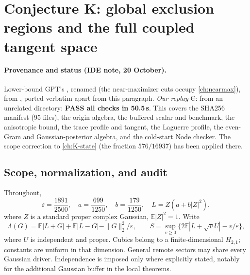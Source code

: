 \section{Conjecture K: global exclusion regions and the full coupled tangent space}
\label{ch:global-local-coupled-K}

\paragraph{Provenance and status (IDE note, 20 October).} Lower-bound GPT's , renamed  (the near-maximizer cuts occupy \autoref{ch:nearmax}), from , ported verbatim apart from this paragraph. \emph{Our replay} \st{C}:
 from an unrelated directory: \textbf{PASS all checks in 50.5\,s}. This covers the SHA256 manifest (95 files), the origin algebra, the
buffered scalar and benchmark, the anisotropic bound, the trace profile and tangent, the Laguerre profile, the even-Gram and Gaussian-posterior algebra, and the cold-start Node checker.
The scope correction to \autoref{ch:K-state} (the fraction $576/16937$) has been applied there.


\subsection{Scope, normalization, and audit}
Throughout,
\[
 \varepsilon=\frac{1891}{2500},\quad a=\frac{699}{1250},\quad
 b=\frac{179}{1250},\quad L=Z(a+b|Z|^2),
\]
where $Z$ is a standard proper complex Gaussian, $\mathbb E|Z|^2=1$.
Write
\[
 \Lambda(G)=\mathbb E|L+G|+\mathbb E|L-G|
                  -\|G\|_2^2/\varepsilon,
 \qquad
 S=\sup_{v\ge0}\{2\mathbb E|L+\sqrt vU|-v/\varepsilon\},
\]
where $U$ is independent and proper. Cubics belong to a finite-dimensional
$H_{2,1}$; constants are uniform in that dimension. General remote sectors
may share every Gaussian driver. Independence is imposed only where explicitly
stated, notably for the additional Gaussian buffer in the local theorems.

